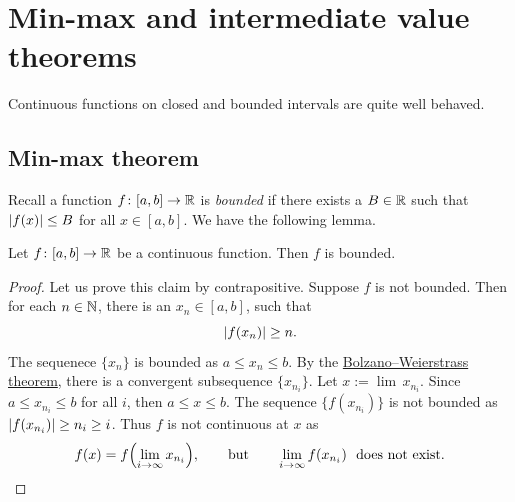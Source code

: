 
\sectionnewpage
\section{Min-max and intermediate value theorems}
\label{sec:minmaxint}


Continuous functions on closed and bounded intervals
are quite well behaved.

\subsection{Min-max theorem}

Recall a function $f \colon [a,b] \to {\mathbb{R}}$ is
\emph{bounded} if there exists a $B \in {\mathbb{R}}$ such that
$\left\lvert {f(x)} \right\rvert \leq B$ for all $x \in [a,b]$.  We have the following lemma.

\begin{lemma}
Let $f \colon [a,b] \to {\mathbb{R}}$ be a continuous function.  Then $f$ is bounded.
\end{lemma}

\begin{proof}
Let us prove this claim by contrapositive.  Suppose $f$ is not bounded.
Then for each
$n \in {\mathbb{N}}$, there is an $x_n \in [a,b]$, such that
\begin{equation*}
\left\lvert {f(x_n)} \right\rvert \geq n .
\end{equation*}
The sequenece $\{ x_n \}$ is bounded as $a \leq x_n \leq b$.
By the \hyperref[thm:bwseq]{Bolzano--Weierstrass theorem},
there is a convergent subsequence $\{ x_{n_i} \}$.  Let $x := \lim\, x_{n_i}$.
Since $a \leq x_{n_i} \leq b$ for all $i$, then $a \leq x \leq b$.
The sequence $\{ f(x_{n_i}) \}$ is not bounded 
as 
$\left\lvert {f(x_{n_i})} \right\rvert \geq n_i \geq i$.
Thus $f$ is not continuous at $x$ as
\begin{equation*}
f(x)
=
f\Bigl( \lim_{i\to\infty} x_{n_i} \Bigr) ,
\qquad\text{but}\qquad
\lim_{i\to\infty} f(x_{n_i}) ~~\text{does not exist.} \qedhere
\end{equation*}
\end{proof}

